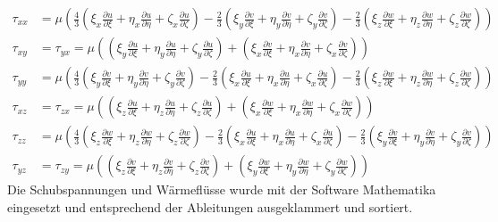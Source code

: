 \begin{align*}
\tau_{xx}&=
\mu \left(\frac{4}{3}\left(\xi_x\frac{\partial u}{\partial \xi}+\eta_x\frac{\partial u}{\partial \eta}+\zeta_x\frac{\partial u}{\partial \zeta}\right)-\frac{2}{3}\left(\xi_y\frac{\partial v}{\partial \xi}+\eta_y\frac{\partial v}{\partial \eta}+\zeta_y\frac{\partial v}{\partial \zeta}\right)-\frac{2}{3}\left(\xi_z\frac{\partial w}{\partial \xi}+\eta_z\frac{\partial w}{\partial \eta}+\zeta_z\frac{\partial w}{\partial \zeta}\right) \right)
\\
\tau_{xy}&=\tau_{yx}=
\mu \left(\left(\xi_y\frac{\partial u}{\partial \xi}+\eta_y\frac{\partial u}{\partial \eta}+\zeta_y\frac{\partial u}{\partial \zeta}\right)+\left(\xi_x\frac{\partial v}{\partial \xi}+\eta_x\frac{\partial v}{\partial \eta}+\zeta_x\frac{\partial v}{\partial \zeta}\right) \right)
\\
\tau_{yy}&=
\mu \left(\frac{4}{3}\left(\xi_y\frac{\partial v}{\partial \xi}+\eta_y\frac{\partial v}{\partial \eta}+\zeta_y\frac{\partial v}{\partial \zeta}\right)-\frac{2}{3}\left(\xi_x\frac{\partial u}{\partial \xi}+\eta_x\frac{\partial u}{\partial \eta}+\zeta_x\frac{\partial u}{\partial \zeta}\right)-\frac{2}{3}\left(\xi_z\frac{\partial w}{\partial \xi}+\eta_z\frac{\partial w}{\partial \eta}+\zeta_z\frac{\partial w}{\partial \zeta}\right) \right)
\\
\tau_{xz}&=\tau_{zx}=
\mu \left(\left(\xi_z\frac{\partial u}{\partial \xi}+\eta_z\frac{\partial u}{\partial \eta}+\zeta_z\frac{\partial u}{\partial \zeta}\right)+\left(\xi_x\frac{\partial w}{\partial \xi}+\eta_x\frac{\partial w}{\partial \eta}+\zeta_x\frac{\partial w}{\partial \zeta}\right) \right)
\\
\tau_{zz}&=
\mu \left(\frac{4}{3}\left(\xi_z\frac{\partial w}{\partial \xi}+\eta_z\frac{\partial w}{\partial \eta}+\zeta_z\frac{\partial w}{\partial \zeta}\right)-\frac{2}{3}\left(\xi_x\frac{\partial u}{\partial \xi}+\eta_x\frac{\partial u}{\partial \eta}+\zeta_x\frac{\partial u}{\partial \zeta}\right)-\frac{2}{3}\left(\xi_y\frac{\partial v}{\partial \xi}+\eta_y\frac{\partial v}{\partial \eta}+\zeta_y\frac{\partial v}{\partial \zeta}\right) \right)
\\
\tau_{yz}&=\tau_{zy}=
\mu \left(\left(\xi_z\frac{\partial v}{\partial \xi}+\eta_z\frac{\partial v}{\partial \eta}+\zeta_z\frac{\partial v}{\partial \zeta}\right)+\left(\xi_y\frac{\partial w}{\partial \xi}+\eta_y\frac{\partial w}{\partial \eta}+\zeta_y\frac{\partial w}{\partial \zeta}\right) \right)
\end{align*}
Die Schubspannungen und Wärmeflüsse wurde mit der Software Mathematika eingesetzt und entsprechend der Ableitungen ausgeklammert und sortiert.
